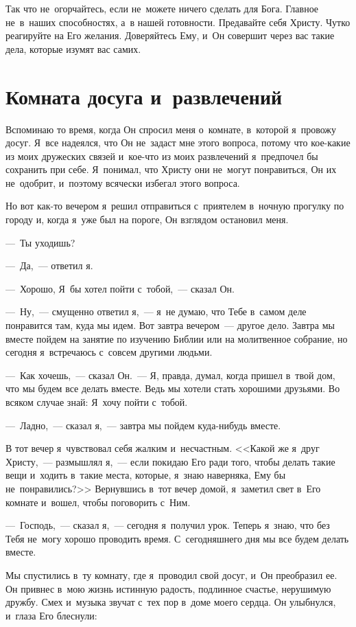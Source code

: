 \documentclass[12pt,article,a4paper,fittopage]{ncc}
\begin{document}
\begin{multicols}{2}
Так что не~огорчайтесь, если не~можете ничего сделать для Бога. Главное не~в~наших способностях, а~в нашей готовности. Предавайте себя Христу. Чутко реагируйте на Его желания. Доверяйтесь Ему, и~Он совершит через вас такие дела, которые изумят вас самих.

\section*{Комната досуга и~развлечений}

Вспоминаю то время, когда Он спросил меня о~комнате, в~которой я~провожу досуг. Я~все надеялся, что Он не~задаст мне этого вопроса, потому что кое-какие из моих дружеских связей и~кое-что из моих развлечений я~предпочел бы сохранить при себе. Я~понимал, что Христу они не~могут понравиться, Он их не~одобрит, и~поэтому всячески избегал этого вопроса.

Но вот как-то вечером я~решил отправиться с~приятелем в~ночную прогулку по городу и, когда я~уже был на пороге, Он взглядом остановил меня.

---~Ты уходишь?

---~Да,~--- ответил я.

---~Хорошо, Я~бы хотел пойти с~тобой,~--- сказал Он.

---~Ну,~--- смущенно ответил я,~--- я~не думаю, что Тебе в~самом деле понравится там, куда мы идем. Вот завтра вечером~--- другое дело. Завтра мы вместе пойдем на занятие по изучению Библии или на молитвенное собрание, но сегодня я~встречаюсь с~совсем другими людьми.

---~Как хочешь,~--- сказал Он.~--- Я, правда, думал, когда пришел в~твой дом, что мы будем все делать вместе. Ведь мы хотели стать хорошими друзьями. Во всяком случае знай: Я~хочу пойти с~тобой.

---~Ладно,~--- сказал я,~--- завтра мы пойдем куда-нибудь вместе.

В тот вечер я~чувствовал себя жалким и~несчастным. <<Какой же я~друг Христу,~--- размышлял я,~--- если покидаю Его ради того, чтобы делать такие вещи и~ходить в~такие места, которые, я~знаю наверняка, Ему бы не~понравились?>> Вернувшись в~тот вечер домой, я~заметил свет в~Его комнате и~вошел, чтобы поговорить с~Ним. 

---~Господь,~--- сказал я,~--- сегодня я~получил урок. Теперь я~знаю, что без Тебя не~могу хорошо проводить время. С~сегодняшнего дня мы все будем делать вместе.

Мы спустились в~ту комнату, где я~проводил свой досуг, и~Он преобразил ее. Он привнес в~мою жизнь истинную радость, подлинное счастье, нерушимую дружбу. Смех и~музыка звучат с~тех пор в~доме моего сердца. Он улыбнулся, и~глаза Его блеснули:


\end{multicols}
\end{document}
